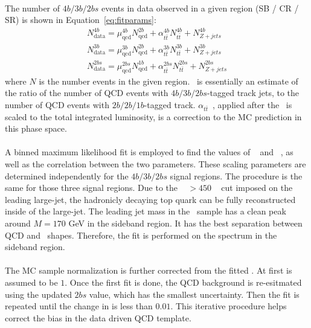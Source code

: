 \paragraph{}
The number of $4b/3b/2bs$ events in data observed in a given region (SB / CR / SR) is shown in Equation~\ref{eq:fitparams}:
\begin{eqnarray}
\label{eq:fitparams}
N^{4b}_{\text{data}} = \mu_{\text{qcd}}^{4b} N^{2b}_{\text{qcd}} + \alpha_{t\bar{t}}^{4b} N^{4b}_{t\bar{t}} + N^{4b}_{Z+jets} \\
N^{3b}_{\text{data}} = \mu_{\text{qcd}}^{3b} N^{2b}_{\text{qcd}} + \alpha_{t\bar{t}}^{3b} N^{3b}_{t\bar{t}} + N^{3b}_{Z+jets} \\
N^{2bs}_{\text{data}} = \mu_{\text{qcd}}^{2bs} N^{1b}_{\text{qcd}} + \alpha_{t\bar{t}}^{2bs} N^{2bs}_{t\bar{t}} + N^{2bs}_{Z+jets}
\end{eqnarray}
where $N$ is the number events in the given region. 
\muqcd\ is essentially an estimate of the ratio of the number of QCD events with $4b/3b/2bs$-tagged track jets, to the number of QCD events with $2b/2b/1b$-tagged track.
$\alpha_{t\bar{t}}$~, applied after the \ttbar\ is scaled to the total integrated luminosity, is a correction to the MC prediction in this phase space.  

\paragraph{}
A binned maximum likelihood fit is employed to find the values of \muqcd~ and \alphatt~, as well as the correlation between the two parameters.
These scaling parameters are determined independently for the $4b/3b/2bs$ signal regions.
The procedure is the same for those three signal regions. 
Due to the \pt~ $>450$ \GeV~ cut imposed on the leading large-\R jet, the hadronicly decaying top quark can be fully reconstructed inside of the large-\R jet. 
The leading jet mass in the \ttbar\ sample has a clean peak around $M=170$ GeV in the sideband region.
It has the best separation between QCD and \ttbar\ shapes.
Therefore, the fit is performed on the \mleadJ spectrum in the sideband region.

\paragraph{}
The \ttbar MC sample normalization is further corrected from the fitted \alphatt.
At first \alphatt is assumed to be $1$.
Once the first fit is done, the QCD background is re-esitmated using the updated $2bs$ \alphatt value, which has the smallest uncertainty.
Then the fit is repeated until the change in \alphatt is less than $0.01$.
This iterative procedure helps correct the \alphatt bias in the data driven QCD template.

